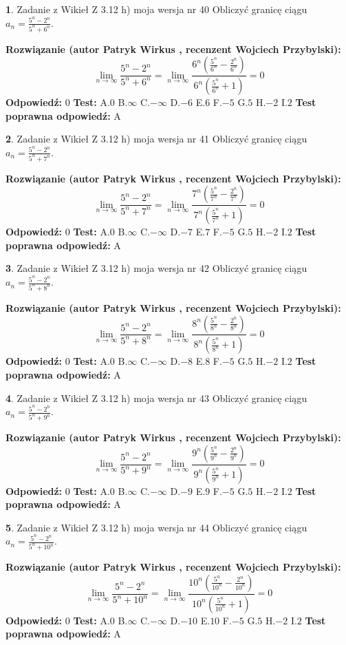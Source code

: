 \documentclass[12pt, a4paper]{article}
\theoremstyle{definition} %
\newtheorem{zad}{}
\newcommand{\zadStart}[1]{\begin{zad}#1\newline}
\newcommand{\zadStop}{\end{zad}}
\newcommand{\rozwStart}[2]{\noindent \textbf{Rozwiązanie (autor #1 , recenzent #2): }\newline}
\newcommand{\rozwStop}{\newline}
\newcommand{\odpStart}{\noindent \textbf{Odpowiedź:}\newline}
\newcommand{\odpStop}{\newline}
\newcommand{\testStart}{\noindent \textbf{Test:}\newline}
\newcommand{\testStop}{\newline}
\newcommand{\kluczStart}{\noindent \textbf{Test poprawna odpowiedź:}\newline}
\newcommand{\kluczStop}{\newline}
\begin{document}
\zadStart{Zadanie z Wikieł Z 3.12 h) moja wersja nr 40}
Obliczyć granicę ciągu $a_{n}=\frac{5^{n} - 2^{n}}{5^{n} + 6^{n}}$.
\zadStop
\rozwStart{Patryk Wirkus}{Wojciech Przybylski}
$$\lim\limits_{n\to\infty}\frac{5^{n} - 2^{n}}{5^{n} + 6^{n}} = \lim\limits_{n\to\infty}\frac{6^{n}(\frac{5^{n}}{6^{n}} - \frac{2^{n}}{6^{n}})}{6^{n}(\frac{5^{n}}{6^{n}} + 1)} = 0$$
\rozwStop
\odpStart
$0$
\odpStop
\testStart
A.$0$
B.$\infty$
C.$-\infty$
D.$-6$
E.$6$
F.$-5$
G.$5$
H.$-2$
I.$2$
\testStop
\kluczStart
A
\kluczStop



\zadStart{Zadanie z Wikieł Z 3.12 h) moja wersja nr 41}
Obliczyć granicę ciągu $a_{n}=\frac{5^{n} - 2^{n}}{5^{n} + 7^{n}}$.
\zadStop
\rozwStart{Patryk Wirkus}{Wojciech Przybylski}
$$\lim\limits_{n\to\infty}\frac{5^{n} - 2^{n}}{5^{n} + 7^{n}} = \lim\limits_{n\to\infty}\frac{7^{n}(\frac{5^{n}}{7^{n}} - \frac{2^{n}}{7^{n}})}{7^{n}(\frac{5^{n}}{7^{n}} + 1)} = 0$$
\rozwStop
\odpStart
$0$
\odpStop
\testStart
A.$0$
B.$\infty$
C.$-\infty$
D.$-7$
E.$7$
F.$-5$
G.$5$
H.$-2$
I.$2$
\testStop
\kluczStart
A
\kluczStop



\zadStart{Zadanie z Wikieł Z 3.12 h) moja wersja nr 42}
Obliczyć granicę ciągu $a_{n}=\frac{5^{n} - 2^{n}}{5^{n} + 8^{n}}$.
\zadStop
\rozwStart{Patryk Wirkus}{Wojciech Przybylski}
$$\lim\limits_{n\to\infty}\frac{5^{n} - 2^{n}}{5^{n} + 8^{n}} = \lim\limits_{n\to\infty}\frac{8^{n}(\frac{5^{n}}{8^{n}} - \frac{2^{n}}{8^{n}})}{8^{n}(\frac{5^{n}}{8^{n}} + 1)} = 0$$
\rozwStop
\odpStart
$0$
\odpStop
\testStart
A.$0$
B.$\infty$
C.$-\infty$
D.$-8$
E.$8$
F.$-5$
G.$5$
H.$-2$
I.$2$
\testStop
\kluczStart
A
\kluczStop



\zadStart{Zadanie z Wikieł Z 3.12 h) moja wersja nr 43}
Obliczyć granicę ciągu $a_{n}=\frac{5^{n} - 2^{n}}{5^{n} + 9^{n}}$.
\zadStop
\rozwStart{Patryk Wirkus}{Wojciech Przybylski}
$$\lim\limits_{n\to\infty}\frac{5^{n} - 2^{n}}{5^{n} + 9^{n}} = \lim\limits_{n\to\infty}\frac{9^{n}(\frac{5^{n}}{9^{n}} - \frac{2^{n}}{9^{n}})}{9^{n}(\frac{5^{n}}{9^{n}} + 1)} = 0$$
\rozwStop
\odpStart
$0$
\odpStop
\testStart
A.$0$
B.$\infty$
C.$-\infty$
D.$-9$
E.$9$
F.$-5$
G.$5$
H.$-2$
I.$2$
\testStop
\kluczStart
A
\kluczStop



\zadStart{Zadanie z Wikieł Z 3.12 h) moja wersja nr 44}
Obliczyć granicę ciągu $a_{n}=\frac{5^{n} - 2^{n}}{5^{n} + 10^{n}}$.
\zadStop
\rozwStart{Patryk Wirkus}{Wojciech Przybylski}
$$\lim\limits_{n\to\infty}\frac{5^{n} - 2^{n}}{5^{n} + 10^{n}} = \lim\limits_{n\to\infty}\frac{10^{n}(\frac{5^{n}}{10^{n}} - \frac{2^{n}}{10^{n}})}{10^{n}(\frac{5^{n}}{10^{n}} + 1)} = 0$$
\rozwStop
\odpStart
$0$
\odpStop
\testStart
A.$0$
B.$\infty$
C.$-\infty$
D.$-10$
E.$10$
F.$-5$
G.$5$
H.$-2$
I.$2$
\testStop
\kluczStart
A
\kluczStop
\end{document}

